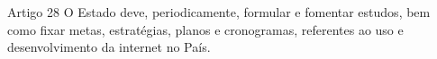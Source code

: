 \begin{frame}{Artigo 28}
O Estado deve, periodicamente, formular e fomentar estudos, bem como fixar metas, estratégias, planos e cronogramas, referentes ao uso e desenvolvimento da internet no País.
\end{frame}